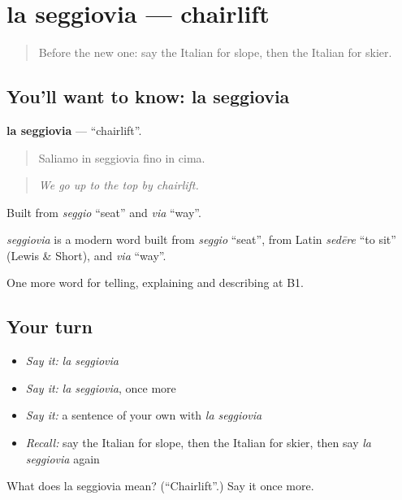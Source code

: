 \section[la seggiovia]{la seggiovia — chairlift}

\label{lesson:IT-C515-seggiovia}



\begin{quote}
Before the new one: say the Italian for slope, then the Italian for skier.
\end{quote}

\subsection*{You'll want to know: la seggiovia}
\textbf{la seggiovia} — \textquotedblleft{}chairlift\textquotedblright{}.

\begin{quote}
Saliamo in seggiovia fino in cima.
\end{quote}

\begin{quote}
\emph{We go up to the top by chairlift.}
\end{quote}

Built from \emph{seggio} \textquotedblleft{}seat\textquotedblright{} and \emph{via} \textquotedblleft{}way\textquotedblright{}.

\begin{cousinweb}
\emph{seggiovia} is a modern word built from \emph{seggio} \textquotedblleft{}seat\textquotedblright{}, from Latin \emph{sedēre} \textquotedblleft{}to sit\textquotedblright{} (Lewis \& Short), and \emph{via} \textquotedblleft{}way\textquotedblright{}.
\end{cousinweb}

\begin{grammarlens}[title={What you've built}]
One more word for telling, explaining and describing at B1.
\end{grammarlens}

\subsection*{Your turn}
\begin{itemize}
\raggedright
  \item \emph{Say it:} \emph{la seggiovia}
  \item \emph{Say it:} \emph{la seggiovia}, once more
  \item \emph{Say it:} a sentence of your own with \emph{la seggiovia}
  \item \emph{Recall:} say the Italian for slope, then the Italian for skier, then say \emph{la seggiovia} again
\end{itemize}

\begin{tcolorbox}[breakable,colback=teal!4,colframe=teal!35!black,title={Before you move on}]
What does la seggiovia mean? (\textquotedblleft{}Chairlift\textquotedblright{}.) Say it once more.
\end{tcolorbox}
